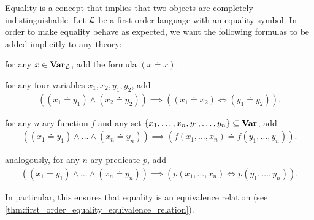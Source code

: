 \begin{note}\label{note:first_order_equality}\cite[definition 5.1]{Nerode2012}
  Equality is a concept that implies that two objects are completely indistinguishable. Let $\mathcal L$ be a first-order language with an equality symbol. In order to make equality behave as expected, we want the following formulas to be added implicitly to any theory:

  \begin{defenum}
    \item\label{note:first_order_equality/reflexivity} for any $x \in \operatorname{\mathbf{Var}}_{\mathcal L}$, add the formula $(x \doteq x)$.
    \item\label{note:first_order_equality/equality} for any four variables $x_1, x_2, y_1, y_2$, add
    \begin{align*}
      ((x_1 \doteq y_1) \land (x_2 \doteq y_2)) \implies ((x_1 \doteq x_2) \iff (y_1 \doteq y_2)).
    \end{align*}

    \item\label{note:first_order_equality/functions} for any $n$-ary function $f$ and any set $\{ x_1, \ldots, x_n, y_1, \ldots, y_n \} \subseteq \operatorname{\mathbf{Var}}$, add
    \begin{align*}
      ((x_1 \doteq y_1) \land \ldots \land (x_n \doteq y_n)) \implies (f(x_1, \ldots, x_n) \doteq f(y_1, \ldots, y_n)).
    \end{align*}

    \item\label{note:first_order_equality/predicates} analogously, for any $n$-ary predicate $p$, add
    \begin{align*}
      ((x_1 \doteq y_1) \land \ldots \land (x_n \doteq y_n)) \implies (p(x_1, \ldots, x_n) \iff p(y_1, \ldots, y_n)).
    \end{align*}
  \end{defenum}

  In particular, this ensures that equality is an equivalence relation (see \cref{thm:first_order_equality_equivalence_relation}).
\end{note}


